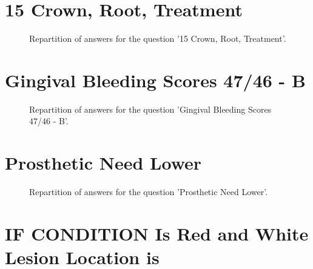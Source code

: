 \documentclass[12pt]{article}
\begin{document}
\clearpage{}
\section{15
Crown, Root, Treatment}

\label{sec:28}


\begin{figure}[h!]
    \caption{\label{figure:q28-1}Repartition of answers for the question '15
Crown, Root, Treatment'.}
\end{figure}



\clearpage{}
\section{Gingival Bleeding Scores
47/46 - B}

\label{sec:61}


\begin{figure}[h!]
    \caption{\label{figure:q61-1}Repartition of answers for the question 'Gingival Bleeding Scores
47/46 - B'.}
\end{figure}



\clearpage{}
\section{Prosthetic Need
Lower}

\label{sec:72}


\begin{figure}[h!]
    \caption{\label{figure:q72-1}Repartition of answers for the question 'Prosthetic Need
Lower'.}
\end{figure}



\clearpage{}
\section{IF CONDITION Is Red and White Lesion 
Location is}
\end{document}
